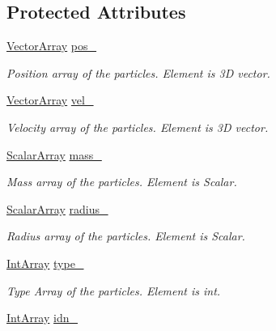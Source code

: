 \subsection*{Protected Attributes}
\begin{DoxyCompactItemize}
\item 
\mbox{\hyperlink{classparticles_ac5dddc8c666e4f7057b5109f95926363}{Vector\+Array}} \mbox{\hyperlink{classparticles_a99e8c11e0b53e2447478bca11625fbd7}{pos\+\_\+}}
\begin{DoxyCompactList}\small\item\em Position array of the particles. Element is 3D vector. \end{DoxyCompactList}\item 
\mbox{\hyperlink{classparticles_ac5dddc8c666e4f7057b5109f95926363}{Vector\+Array}} \mbox{\hyperlink{classparticles_ace6c8d7c95916863c7d03c3a6c51f5bb}{vel\+\_\+}}
\begin{DoxyCompactList}\small\item\em Velocity array of the particles. Element is 3D vector. \end{DoxyCompactList}\item 
\mbox{\hyperlink{classparticles_ac88daa0d493d17c5ca2fe3a1d3fe4779}{Scalar\+Array}} \mbox{\hyperlink{classparticles_a5a2c6b7e9db9350238b8e8b722fa97e1}{mass\+\_\+}}
\begin{DoxyCompactList}\small\item\em Mass array of the particles. Element is Scalar. \end{DoxyCompactList}\item 
\mbox{\hyperlink{classparticles_ac88daa0d493d17c5ca2fe3a1d3fe4779}{Scalar\+Array}} \mbox{\hyperlink{classparticles_a9e59d320a88772648f773687a817db6d}{radius\+\_\+}}
\begin{DoxyCompactList}\small\item\em Radius array of the particles. Element is Scalar. \end{DoxyCompactList}\item 
\mbox{\hyperlink{classparticles_a1b766bf5ccced2005beaacbb07e46bf9}{Int\+Array}} \mbox{\hyperlink{classparticles_ac7293cffd3198ae98d1124af27a7b39c}{type\+\_\+}}
\begin{DoxyCompactList}\small\item\em Type Array of the particles. Element is int. \end{DoxyCompactList}\item 
\mbox{\hyperlink{classparticles_a1b766bf5ccced2005beaacbb07e46bf9}{Int\+Array}} \mbox{\hyperlink{classparticles_a4ff05e024ef147c0dbda37ec9f721dd4}{idn\+\_\+}}

\end{DoxyCompactItemize}
